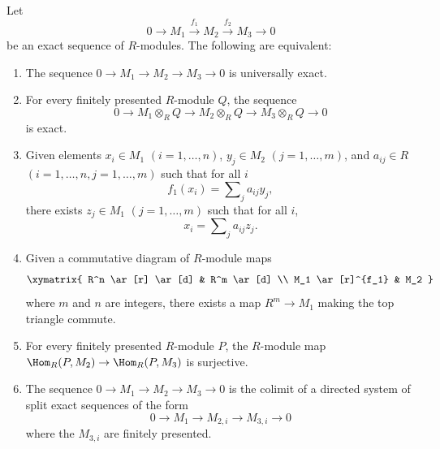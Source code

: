 \begin{theorem}
\label{theorem-universally-exact-criteria}
Let
$$
0 \to M_1 \xrightarrow{f_1} M_2 \xrightarrow{f_2} M_3 \to 0
$$
be an exact sequence of $R$-modules.  The following are equivalent:
\begin{enumerate}
\item The sequence $0 \to M_1 \to M_2 \to M_3
\to 0$ is universally exact.
\item For every finitely presented $R$-module $Q$, the sequence
$$
0 \to M_1 \otimes_R Q \to M_2 \otimes_R Q \to
M_3 \otimes_R Q \to 0
$$
is exact.
\item Given elements $x_i \in M_1$ $(i = 1, \ldots, n)$, $y_j \in M_2$ $(j = 1,
\ldots, m)$, and $a_{ij} \in R$ $(i = 1, \ldots, n, j = 1, \ldots, m)$ such that
for all $i$
$$
f_1(x_i) = \sum\nolimits_j a_{ij} y_j,
$$
there exists $z_j \in M_1$ $(j =1, \ldots, m)$ such that for all $i$,
$$
x_i = \sum\nolimits_j a_{ij} z_j .
$$
\item Given a commutative diagram of $R$-module maps
$$
\xymatrix{
R^n \ar[r] \ar[d] &  R^m \ar[d] \\
M_1 \ar[r]^{f_1}        &  M_2
}
$$
where $m$ and $n$ are integers, there exists a map $R^m \to M_1$ making
the top triangle commute.
\item For every finitely presented $R$-module $P$, the $R$-module
map $\Hom_R(P, M_2) \to \Hom_R(P, M_3)$ is surjective.
\item The sequence $0 \to M_1 \to M_2 \to M_3
\to 0$ is the colimit of a directed system of split exact sequences of
the form
$$
0 \to M_{1} \to M_{2, i} \to M_{3, i} \to 0
$$
where the $M_{3, i}$ are finitely presented.
\end{enumerate}
\end{theorem}

